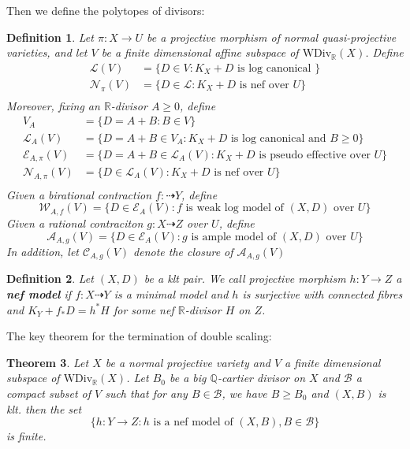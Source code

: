 \documentclass{article}
\newtheorem{defn}{Definition}[section]
\newtheorem{thm}[defn]{Theorem}
\begin{document}
Then we define the polytopes of divisors:
\begin{defn}
Let $ \pi:X\to U $ be a projective morphism of normal quasi-projective varieties, and  let $ V $ be a finite dimensional affine subspace of $ \mathrm{WDiv}_\mathbb{R}(X) $. Define
\begin{equation*}
\begin{aligned}
\mathcal{L}(V)&=\{D\in V: K_X+D \text{ is log canonical }\} \\
\mathcal{N}_\pi(V)&=\{D\in\mathcal{L}:K_X+D \text{ is nef over } U\}\\
\end{aligned}
\end{equation*}
Moreover, fixing an $ \mathbb{R} $-divisor $ A\geqslant 0 $, define
\begin{equation*}
\begin{aligned}
V_A&=\{D=A+B:B\in V\}\\
\mathcal{L}_A(V)&=\{D=A+B\in V_A: K_X+D \text{ is log canonical and  } B\geqslant0 \}\\
\mathcal{E}_{A,\pi}(V)&=\{D=A+B\in \mathcal{L}_A(V): K_X+D \text{ is pseudo effective over } U\}\\
\mathcal{N}_{A,\pi}(V)&=\{D\in\mathcal{L}_A(V):K_X+D \text{ is nef over } U\}\\
\end{aligned}
\end{equation*}
Given a birational contraction $ f:\dashrightarrow Y $, define
$$ \mathcal{W}_{A,f}(V)=\{D\in \mathcal{E}_{A}(V): f \text{ is weak log model of  } (X,D) \text{ over }U\} $$
Given a rational contraciton $g:X\dashrightarrow Z  $ over $ U $, define
$$ \mathcal{A}_{A,g}(V)=\{D\in \mathcal{E}_{A}(V): g \text{ is ample model of  } (X,D) \text{ over }U\} $$
In addition, let $ \mathcal{C}_{A,g}(V) $ denote the closure of $ \mathcal{A}_{A,g}(V) $
\end{defn}
\begin{defn}
Let $ (X,D) $ be a klt pair. We call  projective morphism  $ h:Y\to Z $ a \textbf{nef model} if $ f:X\dashrightarrow Y $ is a minimal model and $ h $ is surjective with connected fibres and $ K_Y+f_*D=h^*H $ for some nef $ \mathbb{R} $-divisor $ H $ on $ Z $.
\end{defn}
The key theorem for the termination of double scaling:
\begin{thm}
Let $ X $ be a normal projective variety and $ V $ a finite dimensional subspace of $ \mathrm{WDiv}_\mathbb{R}(X) $. Let $ B_0 $ be a big $ \mathbb{Q}$-cartier divisor on $ X $ and $ \mathcal{B} $ a compact subset of $ V $ such that for any $ B\in \mathcal{B} $, we have $ B\geqslant B_0 $ and $ (X,B) $ is klt. then the set
$$ \{h:Y\to Z:  h \text{ is a nef model of } (X,B), B\in\mathcal{B} \} $$
is finite.
\end{thm}
\end{document}
